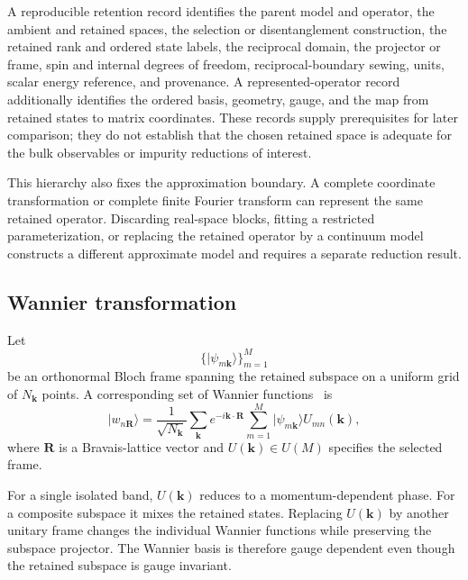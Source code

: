 A reproducible retention record identifies the parent model and operator, the
ambient and retained spaces, the selection or disentanglement construction,
the retained rank and ordered state labels, the reciprocal domain, the
projector or frame, spin and internal degrees of freedom, reciprocal-boundary
sewing, units, scalar energy reference, and provenance. A represented-operator
record additionally identifies the ordered basis, geometry, gauge, and the map
from retained states to matrix coordinates. These records supply prerequisites
for later comparison; they do not establish that the chosen retained space is
adequate for the bulk observables or impurity reductions of interest.

This hierarchy also fixes the approximation boundary. A complete coordinate
transformation or complete finite Fourier transform can represent the same
retained operator. Discarding real-space blocks, fitting a restricted
parameterization, or replacing the retained operator by a continuum model
constructs a different approximate model and requires a separate reduction
result.

\subsection{Wannier transformation}


Let
\begin{equation}
  \{\lvert\psi_{m\mathbf k}\rangle\}_{m=1}^{M}
\end{equation}
be an orthonormal Bloch frame spanning the retained subspace on a uniform grid
of $N_{\mathbf k}$ points. A corresponding set of Wannier
functions~\cite{wannier1937} is
\begin{equation}
  \lvert w_{n\mathbf R}\rangle
  =
  \frac{1}{\sqrt{N_{\mathbf k}}}
  \sum_{\mathbf k}e^{-i\mathbf k\cdot\mathbf R}
  \sum_{m=1}^{M}
  \lvert\psi_{m\mathbf k}\rangle U_{mn}(\mathbf k),
\end{equation}
where $\mathbf R$ is a Bravais-lattice vector and
$U(\mathbf k)\in U(M)$ specifies the selected frame.

For a single isolated band, $U(\mathbf k)$ reduces to a momentum-dependent
phase. For a composite subspace it mixes the retained states. Replacing
$U(\mathbf k)$ by another unitary frame changes the individual Wannier
functions while preserving the subspace projector. The Wannier basis is
therefore gauge dependent even though the retained subspace is gauge invariant.

